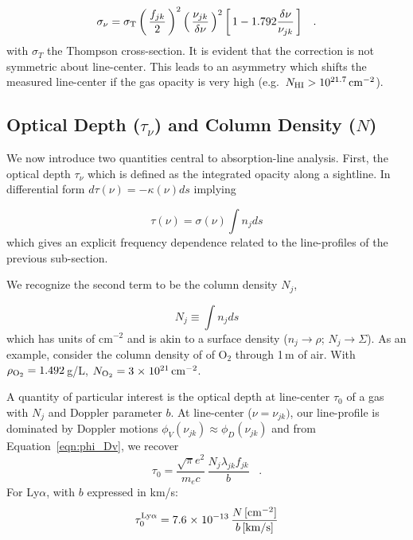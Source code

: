 \documentclass[graybox]{svmult}
\def\ltk{\left [ \,}
\def\ltp{\left ( \,}
\def\rtk{\, \right  ] }
\def\rtp{\, \right  ) }
\def\sci#1{{\; \times \; 10^{#1}}}
\def\perd{\;\;\; .}
\newcommand{\mnhi}{N_{\rm HI}}
\def\cm#1{\, {\rm cm^{#1}}}
\begin{document}
\begin{equation}
\sigma_\nu = \sigma_{\rm T} \ltp \frac{f_{jk}}{2} \rtp^2 
\ltp \frac{\nu_{jk}}{\delta\nu} \rtp^2
\ltk 1 - 1.792 \frac{\delta\nu}{\nu_{jk}} \rtk  \perd
\end{equation}
with $\sigma_T$ the Thompson cross-section.
It is evident that the correction is not symmetric about line-center.
This leads to an asymmetry which
shifts the measured line-center if the gas opacity
is very high (e.g.\ $\mnhi > 10^{21.7} \cm{-2}$).

\subsection{Optical Depth ($\tau_\nu$) and Column Density ($N$)}
\label{subsec:tauN}

We now introduce two quantities central to absorption-line analysis.
First, the optical depth $\tau_\nu$ which is defined as the integrated
opacity along a sightline.  In differential form
$d\tau(\nu) = -\kappa(\nu) ds$ implying

\begin{equation}
\tau(\nu) = \sigma(\nu) \int n_j ds
\end{equation}
which gives an explicit frequency dependence related to the line-profiles
of the previous sub-section.

We recognize the second term to be 
the column density $N_j$,

\begin{equation}
N_j \equiv \int n_j ds
\end{equation}
which has units of cm$^{-2}$ and is akin to a surface density
($n_j \to \rho$; $N_j \to \Sigma$).
As an example, consider the column density of 
of O$_2$ through 1\,m of air.  
With $\rho_{\rm O_2} = 1.492$\,g/L,
$N_{\rm O_2} = 3\sci{21} \cm{-2}$.

A quantity of particular interest is the 
optical depth at line-center $\tau_0$ of a gas with $N_j$
and Doppler parameter $b$.
At line-center ($\nu = \nu_{jk})$, our line-profile is 
dominated by Doppler motions
$\phi_V(\nu_{jk}) \approx \phi_D (\nu_{jk})$ and from 
Equation~\ref{eqn:phi_Dv}, we recover
\begin{equation}
\tau_0 =  \frac{\sqrt{\pi} e^2}{m_e c} \, \frac{N_j \lambda_{jk} f_{jk}}{b} \perd
\label{eqn:tau0}
\end{equation}
For Ly$\alpha$, with $b$ expressed in km/s:
\begin{equation}
\tau_0^{\rm Ly\alpha} =  7.6 \sci{-13} \, 
\frac{N \, [\rm cm^{-2}]}{b \, [\rm km/s]}
\label{eqn:tau0_Lya}
\end{equation}
\end{document}
